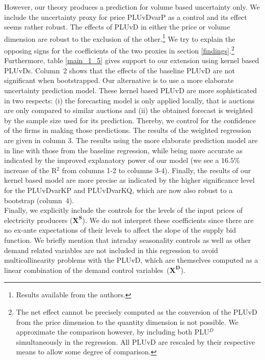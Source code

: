 However, our theory produces a prediction for volume based uncertainty only. We include the uncertainty proxy for price PLUvDvarP as a control and its effect seems rather robust. The effects of PLUvD in either the price or volume dimension are robust to the exclusion of the other.\footnote{Results available from the authors.} We try to explain the opposing signs for the coefficients of the two proxies in section \ref{findings}.\footnote{The net effect cannot be precisely computed as the conversion of the PLUvD from the price dimension to the quantity dimension is not possible. We approximate the comparison however, by including both PLU$^{D}$ simultaneously in the regression. All PLUvD are rescaled by their respective means to allow some degree of comparison.} \\

Furthermore, table \ref{main_1_5} gives support to our extension using kernel based PLUvDs. Column~2 shows that the effects of the baseline PLUvD are not significant when bootstrapped. Our alternative is to use a more elaborate uncertainty prediction model.  These kernel based PLUvD are more sophisticated in two respects: (i) the forecasting model is only applied locally, that is auctions are only compared to similar auctions and (ii) the obtained forecast is weighted by the sample size used for its prediction. Thereby, we control for the confidence of the firms in making those predictions. The results of the weighted regression are given in column 3. The results using the more elaborate prediction model are
in line with those from the baseline regression, while being more accurate as indicated by the improved explanatory power of our model (we see a $16.5\%$ increase of the R$^2$ from columns 1-2 to columns 3-4). Finally, the results of our kernel based model are more precise as indicated by the higher significance level for the PLUvDvarKP and PLUvDvarKQ, which are now also robust to a bootstrap (column~4).\\




Finally, we explicitly include the controls for the levels of the input prices of electricity producers ($\boldsymbol{X^S}$). We do not interpret these coefficients since there are no ex-ante expectations of their levels to affect the slope of the supply bid function. We briefly mention that intraday seasonality controls as well as other demand related variables are not included in this regression to avoid multicollinearity problems with the PLUvD, which are themselves computed as a linear combination of the demand control variables~($\boldsymbol{X^D}$). \\

